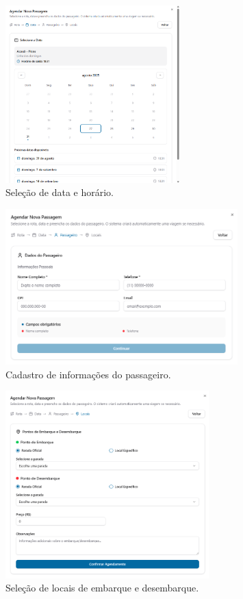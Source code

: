 \begin{figure}[H]
  \centering
  \includegraphics[width=0.6\textwidth]{imagens/wizard-data.png}
  \caption{Seleção de data e horário.}
  \label{fig:wizard-data}
\end{figure}

\begin{figure}[H]
  \centering
  \includegraphics[width=0.8\textwidth]{imagens/wizard-passageiro.png}
  \caption{Cadastro de informações do passageiro.}
  \label{fig:wizard-passageiro}
\end{figure}

\begin{figure}[H]
  \centering
  \includegraphics[width=0.7\textwidth]{imagens/wizard-locais.png}
  \caption{Seleção de locais de embarque e desembarque.}
  \label{fig:wizard-locais}
\end{figure}


